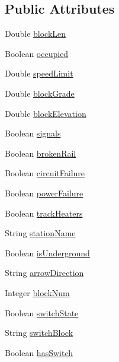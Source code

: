 \subsection*{Public Attributes}
\begin{DoxyCompactItemize}
\item 
Double \hyperlink{classTrackModel_1_1Block_a2272dc912ea46c59930f09258668a833}{block\+Len}
\item 
Boolean \hyperlink{classTrackModel_1_1Block_a000b5a3720b78b92062bbd2a9c560f6a}{occupied}
\item 
Double \hyperlink{classTrackModel_1_1Block_a62ab3ddedf85055005dfdd4402716e65}{speed\+Limit}
\item 
Double \hyperlink{classTrackModel_1_1Block_a445ba69829a748448595df9e048cc2ab}{block\+Grade}
\item 
Double \hyperlink{classTrackModel_1_1Block_ab26ac3adf1ce690a6e187df65f730b0d}{block\+Elevation}
\item 
Boolean \hyperlink{classTrackModel_1_1Block_a7fd1ac5eadeb3dd29da9fab51c8c26f2}{signals}
\item 
Boolean \hyperlink{classTrackModel_1_1Block_a059c0f4f0b6f5d7b50deee6f13538bab}{broken\+Rail}
\item 
Boolean \hyperlink{classTrackModel_1_1Block_a90373dff7852d248a540bd9d9f0514cb}{circuit\+Failure}
\item 
Boolean \hyperlink{classTrackModel_1_1Block_a1c69717cb3818955e60763bc8f4dff8a}{power\+Failure}
\item 
Boolean \hyperlink{classTrackModel_1_1Block_afd3cf37d0f925e0440179716b2ad2730}{track\+Heaters}
\item 
String \hyperlink{classTrackModel_1_1Block_a178efb49178fd7418c6391ea3e35f106}{station\+Name}
\item 
Boolean \hyperlink{classTrackModel_1_1Block_a3cb044acc87b68c2f7e482c2cdfdeab2}{is\+Underground}
\item 
String \hyperlink{classTrackModel_1_1Block_ad5c1ad3ac7452483c42dec413dbb63ab}{arrow\+Direction}
\item 
Integer \hyperlink{classTrackModel_1_1Block_a429f329eb3c1e2ff40389df240f02b00}{block\+Num}
\item 
Boolean \hyperlink{classTrackModel_1_1Block_a5c2a0d414f6cca8552f476dd12e94d3f}{switch\+State}
\item 
String \hyperlink{classTrackModel_1_1Block_a04565d6aa499ef51700e9e69d290e7e0}{switch\+Block}
\item 
Boolean \hyperlink{classTrackModel_1_1Block_a1970e1588e5e0645096dc13094b640ff}{has\+Switch}

\end{DoxyCompactItemize}
